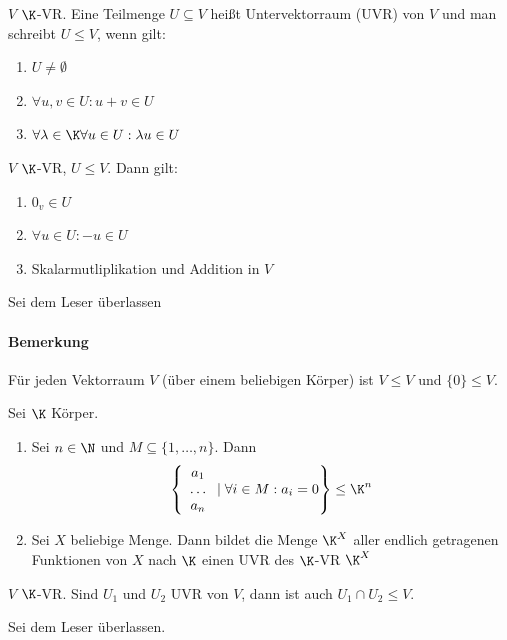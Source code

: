 \begin{definition}
	$V$ $\K$-VR. Eine Teilmenge $U\subseteq V$ heißt Untervektorraum (UVR) von $V$ und man schreibt $U\leq V$, wenn gilt:
	\begin{enumerate}
		\item $U\neq \emptyset$
		\item $\forall u,v \in U: u+v \in U$
		\item $\forall \lambda \in \K \forall u \in U: \lambda u \in U$
	\end{enumerate}
\end{definition}
\begin{lemma}
	$V$ $\K$-VR, $U\leq V$. Dann gilt:
	\begin{enumerate}
		\item $0_v\in U$
		\item $\forall u \in U: -u \in U$
		\item Skalarmutliplikation und Addition in $V$
	\end{enumerate}
\end{lemma}
\prove Sei dem Leser überlassen
\paragraph{Bemerkung} Für jeden Vektorraum $V$ (über einem beliebigen Körper) ist $V\leq V$ und $\{0\}\leq V$.
\begin{example}
	Sei $\K$ Körper.
	\begin{enumerate}
		\item Sei $n\in \N$ und $M\subseteq \{1,\dots, n\}$. Dann
		\begin{align*}
			\left\{\begin{array}{c}
				a_1\\\dots\\a_n
			\end{array}\mid \forall i \in M: a_i = 0\right\} \leq \K^n
		\end{align*}
		\item Sei $X$ beliebige Menge. Dann bildet die Menge $\K^X$ aller endlich getragenen Funktionen von $X$ nach $\K$ einen UVR des $\K$-VR $\K^X$
	\end{enumerate}
\end{example}
\begin{lemma}
	$V$ $\K$-VR. Sind $U_1$ und $U_2$ UVR von $V$, dann ist auch $U_1\cap U_2\leq V$.
\end{lemma}
\prove Sei dem Leser überlassen.
